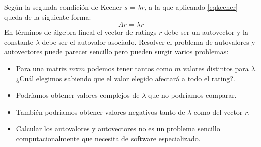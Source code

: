 	
Según la segunda condición de Keener $s= \lambda r$, a la que aplicando \ref{eqkeener} queda de la siguiente forma:
\begin{equation} \label{eqkeener2}
Ar= \lambda r
\end{equation}
En términos de álgebra lineal el vector de ratings $r$ debe ser un autovector y la constante $\lambda$ debe ser el autovalor asociado. Resolver el problema de autovalores y autovectores puede parecer sencillo pero pueden surgir varios problemas:
\begin{itemize}
	\item Para una matriz $m$x$m$ podemos tener tantos como $m$ valores distintos para $\lambda$. ¿Cuál elegimos sabiendo que el valor elegido afectará a todo el rating?.
	\item Podríamos obtener valores complejos de $\lambda$ que no podríamos comparar.
	\item También podríamos obtener valores negativos tanto de $\lambda$ como del vector $r$.
	\item Calcular los autovalores y autovectores no es un problema sencillo computacionalmente que necesita de software especializado.
\end{itemize}

